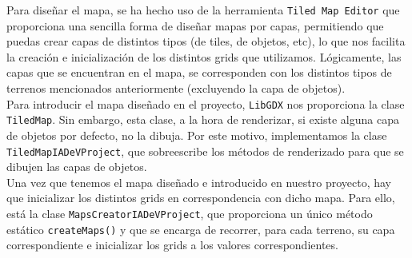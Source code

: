 Para diseñar el mapa, se ha hecho uso de la herramienta \texttt{Tiled Map Editor} \cite{tiledMap} que proporciona una sencilla forma de diseñar mapas por capas, permitiendo que puedas crear capas de distintos tipos (de tiles, de objetos, etc), lo que nos facilita la creación e inicialización de los distintos grids que utilizamos. Lógicamente, las capas que se encuentran en el mapa, se corresponden con los distintos tipos de terrenos mencionados anteriormente (excluyendo la capa de objetos). \\

Para introducir el mapa diseñado en el proyecto, \texttt{LibGDX} nos proporciona la clase \texttt{TiledMap}. Sin embargo, esta clase, a la hora de renderizar, si existe alguna capa de objetos por defecto, no la dibuja. Por este motivo, implementamos la clase \texttt{TiledMapIADeVProject}, que sobreescribe los métodos de renderizado para que se dibujen las capas de objetos. \\

Una vez que tenemos el mapa diseñado e introducido en nuestro proyecto, hay que inicializar los distintos grids en correspondencia con dicho mapa. Para ello, está la clase \texttt{MapsCreatorIADeVProject}, que proporciona un único método estático \texttt{createMaps()} y que se encarga de recorrer, para cada terreno, su capa correspondiente e inicializar los grids a los valores correspondientes.


























